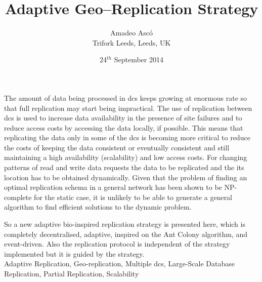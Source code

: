 \documentclass{acm_proc_article-sp}
\begin{document}
\title{Adaptive Geo--Replication Strategy}

\author{Amadeo Asc\'{o}\\ Trifork Leeds, Leeds, UK}

\date{24$^{th}$ September 2014}

\maketitle

\abstract
The amount of data being processed in \glspl{dc} keeps growing at enormous rate so that full replication may start being impractical. The use of replication between \glspl{dc} is used to increase data availability in the presence of site failures and to reduce access costs by accessing the data locally, if possible. This means that replicating the data only in some of the \glspl{dc} is becoming more critical to reduce the costs of keeping the data consistent or eventually consistent and still maintaining a high availability (scalability) and low access costs. For changing patterns of read and write data requests the data to be replicated and the its location has to be obtained dynamically. Given that the problem of finding an optimal replication schema in a general network has been shown to be NP-complete for the static case, it is unlikely to be able to generate a general algorithm to find efficient solutions to the dynamic problem.

So a new adaptive bio-inspired replication strategy is presented here, which is completely decentralised, adaptive, inspired on the Ant Colony algorithm, and event-driven. Also the replication protocol is independent of the strategy implemented but it is guided by the strategy.\\

\keywords
Adaptive Replication, Geo-replication, Multiple \glspl{dc}, Large-Scale Database Replication, Partial Replication, Scalability
\end{document}

